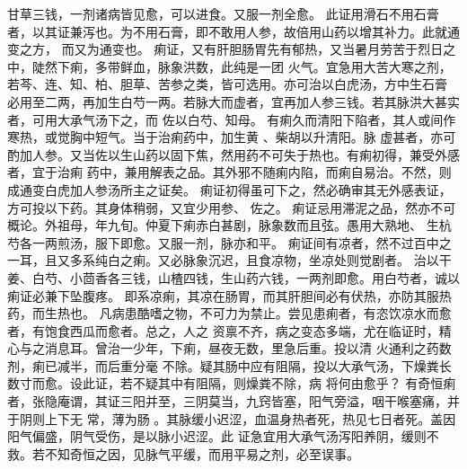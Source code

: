 \documentclass[a4paper,12pt,UTF8,twoside]{ctexbook}
\begin{document}
甘草三钱，一剂诸病皆见愈，可以进食。又服一剂全愈。 
此证用滑石不用石膏者，以其证兼泻也。为不用石膏，即不敢用人参，故倍用山药以增其补力。此就通变之方， 
而又为通变也。 
痢证，又有肝胆肠胃先有郁热，又当暑月劳苦于烈日之中，陡然下痢，多带鲜血，脉象洪数，此纯是一团 
火气。宜急用大苦大寒之剂，若芩、连、知、柏、胆草、苦参之类，皆可选用。亦可治以白虎汤，方中生石膏 
必用至二两，再加生白芍一两。若脉大而虚者，宜再加人参三钱。若其脉洪大甚实者，可用大承气汤下之，而 
佐以白芍、知母。 
有痢久而清阳下陷者，其人或间作寒热，或觉胸中短气。当于治痢药中，加生黄 、柴胡以升清阳。脉 
虚甚者，亦可酌加人参。又当佐以生山药以固下焦，然用药不可失于热也。有痢初得，兼受外感者，宜于治痢 
药中，兼用解表之品。其外邪不随痢内陷，而痢自易治。不然，则成通变白虎加人参汤所主之证矣。 
痢证初得虽可下之，然必确审其无外感表证，方可投以下药。其身体稍弱，又宜少用参、 佐之。 
痢证忌用滞泥之品，然亦不可概论。外祖母，年九旬。仲夏下痢赤白甚剧，脉象数而且弦。愚用大熟地、 
生杭芍各一两煎汤，服下即愈。又服一剂，脉亦和平。 
痢证间有凉者，然不过百中之一耳，且又多系纯白之痢。又必脉象沉迟，且食凉物，坐凉处则觉剧者。 
治以干姜、白芍、小茴香各三钱，山楂四钱，生山药六钱，一两剂即愈。用白芍者，诚以痢证必兼下坠腹疼。 
即系凉痢，其凉在肠胃，而其肝胆间必有伏热，亦防其服热药，而生热也。 
凡病患酷嗜之物，不可力为禁止。尝见患痢者，有恣饮凉水而愈者，有饱食西瓜而愈者。总之，人之 
资禀不齐，病之变态多端，尤在临证时，精心与之消息耳。曾治一少年，下痢，昼夜无数，里急后重。投以清 
火通利之药数剂，痢已减半，而后重分毫 
不除。疑其肠中应有阻隔，投以大承气汤，下燥粪长数寸而愈。设此证，若不疑其中有阻隔，则燥粪不除，病 
将何由愈乎？ 
有奇恒痢者，张隐庵谓，其证三阳并至，三阴莫当，九窍皆塞，阳气旁溢，咽干喉塞痛，并于阴则上下无 
常，薄为肠 。其脉缓小迟涩，血温身热者死，热见七日者死。盖因阳气偏盛，阴气受伤，是以脉小迟涩。此 
证急宜用大承气汤泻阳养阴，缓则不救。若不知奇恒之因，见脉气平缓，而用平易之剂，必至误事。 
\end{document}

